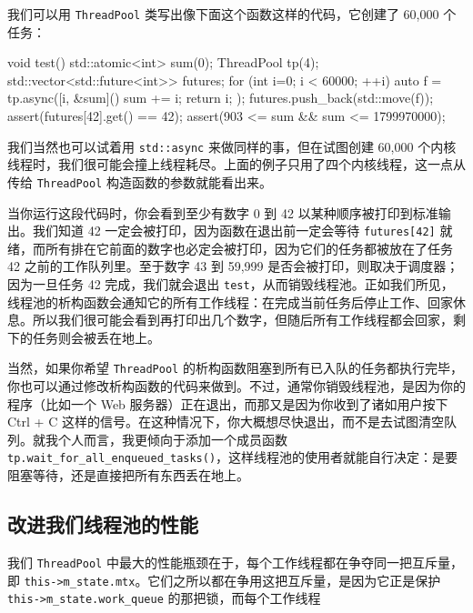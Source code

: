 我们可以用 \texttt{Thread\allowbreak{}Pool} 类写出像下面这个函数这样的代码，它创建了 60,000 个任务：

\begin{codebox}[cpp]
    void test() {
      std::atomic<int> sum(0);
      ThreadPool tp(4);
      std::vector<std::future<int>> futures;
      for (int i=0; i < 60000; ++i) {
        auto f = tp.async([i, &sum](){
          sum += i;
          return i;
        });
        futures.push_back(std::move(f));
      }
      assert(futures[42].get() == 42);
      assert(903 <= sum && sum <= 1799970000);
    }
\end{codebox}

我们当然也可以试着用 \texttt{std::\allowbreak{}async} 来做同样的事，但在试图创建 60,000 个内核线程时，我们很可能会撞上线程耗尽。上面的例子只用了四个内核线程，这一点从传给 \texttt{Thread\allowbreak{}Pool} 构造函数的参数就能看出来。

当你运行这段代码时，你会看到至少有数字 0 到 42 以某种顺序被打印到标准输出。我们知道 42 一定会被打印，因为函数在退出前一定会等待 \texttt{futures[42]} 就绪，而所有排在它前面的数字也必定会被打印，因为它们的任务都被放在了任务 42 之前的工作队列里。至于数字 43 到 59,999 是否会被打印，则取决于调度器；因为一旦任务 42 完成，我们就会退出 \texttt{test}，从而销毁线程池。正如我们所见，线程池的析构函数会通知它的所有工作线程：在完成当前任务后停止工作、回家休息。所以我们很可能会看到再打印出几个数字，但随后所有工作线程都会回家，剩下的任务则会被丢在地上。

当然，如果你希望 \texttt{Thread\allowbreak{}Pool} 的析构函数阻塞到所有已入队的任务都执行完毕，你也可以通过修改析构函数的代码来做到。不过，通常你销毁线程池，是因为你的程序（比如一个 Web 服务器）正在退出，而那又是因为你收到了诸如用户按下 Ctrl + C 这样的信号。在这种情况下，你大概想尽快退出，而不是去试图清空队列。就我个人而言，我更倾向于添加一个成员函数 \texttt{tp.\allowbreak{}wait\_\allowbreak{}for\_\allowbreak{}all\_\allowbreak{}enqueued\_\allowbreak{}tasks(\allowbreak{})\allowbreak{}}，这样线程池的使用者就能自行决定：是要阻塞等待，还是直接把所有东西丢在地上。

\subsection{改进我们线程池的性能}

我们 \texttt{Thread\allowbreak{}Pool} 中最大的性能瓶颈在于，每个工作线程都在争夺同一把互斥量，即 \texttt{this->m\_\allowbreak{}state.\allowbreak{}mtx}。它们之所以都在争用这把互斥量，是因为它正是保护 \texttt{this->m\_\allowbreak{}state.\allowbreak{}work\_\allowbreak{}queue} 的那把锁，而每个工作线程

